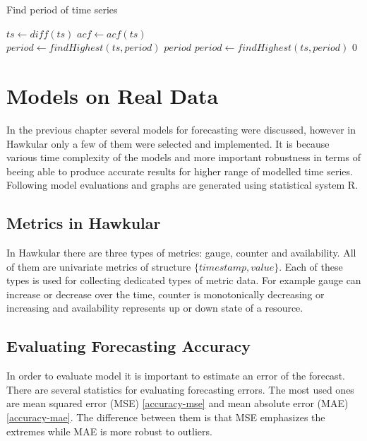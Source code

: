     \begin{algorithm}
        \caption{Find period of time series} \label{alg:period-find}
        \begin{algorithmic}[1]
             
                \State $ts \gets diff(ts)$ 
            \EndIf
            \State $acf \gets acf(ts)$ \\
            \State $period \gets findHighest(ts, period)$
                    \State \Return $period$
                \EndIf
                $period \gets findHighest(ts, period)$
            \EndWhile
            \State \Return $0$
        \EndFunction
        \end{algorithmic}
    \end{algorithm}

\chapter{Models on Real Data}
In the previous chapter several models for forecasting were discussed, however in Hawkular only a few of them were
selected and implemented. It is because various time complexity of the models and more important robustness in terms of
beeing able to produce accurate results for higher range of modelled time series.
Following model evaluations and graphs are generated using statistical system R.

    \section{Metrics in Hawkular}
    In Hawkular there are three types of metrics: gauge, counter and availability. All of them are univariate metrics
    of structure $ \{timestamp, value\} $. Each of these types is used for collecting dedicated types of metric data.
    For example gauge can increase or decrease over the time, counter is monotonically decreasing or increasing and
    availability represents up or down state of a resource.

    \section{Evaluating Forecasting Accuracy}
    In order to evaluate model it is important to estimate an error of the forecast. There are 
    several statistics for evaluating forecasting errors. The most used ones are mean squared error (MSE)
    \ref{accuracy-mse} and mean absolute error (MAE) \ref{accuracy-mae}. The difference between them is that MSE
    emphasizes the extremes while MAE is more robust to outliers.

